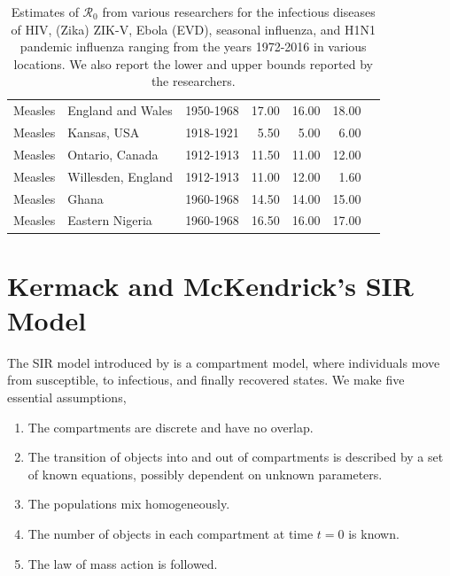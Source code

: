 \documentclass[12pt]{article}
\newcommand{\rr}{\ensuremath{\mathcal{R}_0}}
\begin{document}
\begin{landscape}
\begin{table}[H]
\begin{tabular}{@{}lllrrrl@{}}
  Measles     & England and Wales                  & 1950-1968                          & 17.00      & 16.00          & 18.00         & \cite{anderson1992}     \\
  Measles     & Kansas, USA                  & 1918-1921                          & 5.50    & 5.00          & 6.00          & \cite{anderson1992}     \\
  Measles     & Ontario, Canada                  & 1912-1913                         & 11.50        & 11.00           & 12.00            & \cite{anderson1992}     \\
  Measles     & Willesden, England                  & 1912-1913                          & 11.00        & 12.00       & 1.60            & \cite{anderson1992}     \\
  Measles     & Ghana                 & 1960-1968                          & 14.50       & 14.00          & 15.00            & \cite{anderson1992}     \\
  Measles     & Eastern Nigeria                  & 1960-1968                          & 16.50        & 16.00          & 17.00           & \cite{anderson1992}     \\
\bottomrule
\end{tabular}
\caption{Estimates of $\rr$ from various researchers for the infectious diseases of HIV, (Zika) ZIK-V, Ebola (EVD), seasonal influenza, and H1N1 pandemic influenza ranging from the years 1972-2016 in various locations.  We also report the lower and upper bounds reported by the researchers.}
\label{tab:r0-real-ex}
\end{table}
\end{landscape}

\section{Kermack and McKendrick's SIR Model}
\label{sec:sir-intro}

The SIR model introduced by \cite{Kermack700} is a compartment model, where individuals move from susceptible, to infectious, and finally recovered states.  We make five essential assumptions,
\begin{enumerate}
\item The compartments are discrete and have no overlap.
\item The transition of objects into and out of compartments is described by a set of known equations, possibly dependent on unknown parameters.
\item The populations mix homogeneously.
\item The number of objects in each compartment at time $t=0$ is known.
  \item The law of mass action is followed.
  \end{enumerate}  
\end{document}

